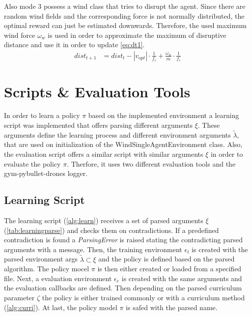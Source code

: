 Also mode 3 possess a wind class that tries to disrupt the agent. Since there are random wind fields and the corresponding force is not normally distributed, the optimal reward can just be estimated downwards. Therefore, the used maximum wind force $\omega_w$ is used in order to approximate the maximum of disruptive distance and use it in order to update \cref{eq:dt1}.
\begin{align}
	dist_{t+1} &= dist_t - | v_{opt} | \cdot \frac{1}{f_c} + \frac{\omega_w}{m} \cdot \frac{1}{f_c}
\end{align}
\newpage



\newpage

\section{Scripts \& Evaluation Tools} \label{sec:scripts}
In order to learn a policy $\pi$ based on the implemented environment a learning script was implemented that offers parsing different arguments $\xi$. These arguments define the learning process and different environment arguments $\tilde{\lambda}$, that are used on initialization of the WindSingleAgentEnvironment class.
Also, the evaluation script offers a similar script with similar arguments $\xi$ in order to evaluate the policy $\pi$.
Therfore, it uses two different evaluation tools and the gym-pybullet-drones logger. 


\subsection{Learning Script}
The learning script (\cref{alg:learn}) receives a set of parsed arguments $\xi$ (\cref{tab:learningparse}) and checks them on contradictions. If a predefined contradiction is found a \emph{ParsingError} is raised stating the contradicting parsed arguments with a message.
Then, the training environment $\epsilon_t$ is created with the parsed environment args $\tilde{\lambda} \subset \xi$ and the policy is defined based on the parsed algorithm. The policy mocel $\pi$ is then either created or loaded from a specified file. Next, a evaluation environment $\epsilon_e$ is created with the same arguments and the evaluation callbacks are defined. Then depending on the parsed curriculum parameter $\zeta$ the policy is either trained commonly or with a curriculum method (\cref{alg:curri}).
At last, the policy model $\pi$ is safed with the parsed name.

